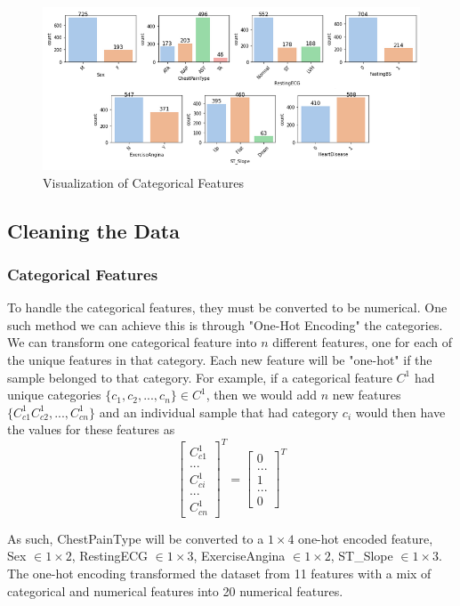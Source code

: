 \documentclass[12pt,conference]{IEEEtran}
\begin{document}
\begin{figure}[t]
\centering\includegraphics[width=\textwidth]{categories}
\caption{\label{fig:categories}Visualization of Categorical Features}
\end{figure}

\subsection{Cleaning the Data}
\label{CleaningData}
\subsubsection{Categorical Features} 
To handle the categorical features, they must be converted to be numerical. One such method we can achieve this is through "One-Hot Encoding" the categories. We can transform one categorical feature into $n$ different features, one for each of the unique features in that category. Each new feature will be "one-hot" if the sample belonged to that category. For example, if a categorical feature $C^1$ had unique categories $\{c_1, c_2, ..., c_n\} \in C^1$, then we would add $n$ new features $\{C^1_{c1} C^1_{c2}, ..., C^1_{cn}\}$ and an individual sample that had category $c_i$ would then have the values for these features as
$$\begin{bmatrix}C^1_{c1}\\...\\C^1_{ci}\\...\\C^1_{cn}\end{bmatrix}^T = \begin{bmatrix}0\\...\\1\\...\\0\end{bmatrix}^T $$

As such, ChestPainType will be converted to a $1\times 4$ one-hot encoded feature, Sex $\in 1\times 2$, RestingECG $\in 1\times 3$, ExerciseAngina $\in 1\times 2$, ST\_Slope $\in 1\times 3$. The one-hot encoding transformed the dataset from 11 features with a mix of categorical and numerical features into 20 numerical features.
\end{document}
